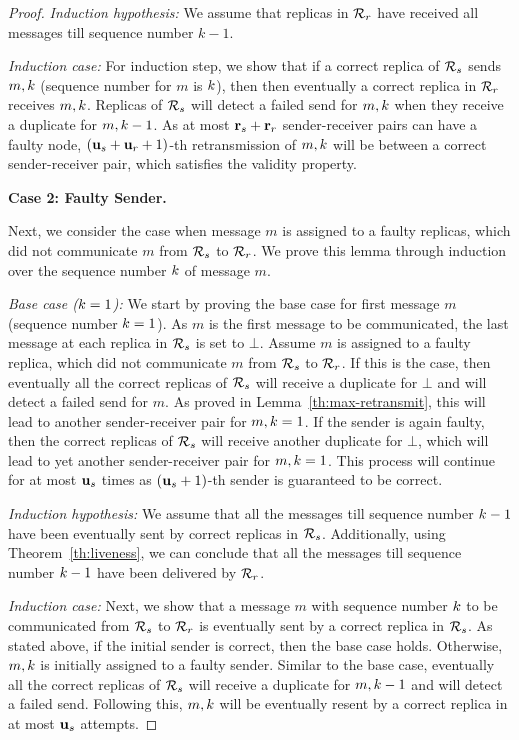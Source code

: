 \begin{proof}
    {\em Induction hypothesis:}
    We assume that replicas in $\mathcal{R}_{r}$ have received all messages till sequence number $k-1$.

    {\em Induction case:}
    For induction step, we show that if a correct replica of $\mathcal{R}_{s}$ sends $m, k$ (sequence number for $m$ is $k$), 
    then then eventually a correct replica in \RSM{} $\mathcal{R}_{r}$ receives $m, k$.
    Replicas of $\mathcal{R}_{s}$ will detect a failed send for $m, k$ when they receive a duplicate \quack{} for $m, k-1$. 
    As at most $\textbf{r}_{s}+\textbf{r}_{r}$ sender-receiver pairs can have a faulty node,
    $(\textbf{u}_{s}+\textbf{u}_{r}+1)$-th retransmission of $m, k$ will be between a correct sender-receiver pair, which 
    satisfies the validity property.

    {\bf Case 2: Faulty Sender.}
    
    Next, we consider the case when message $m$ is assigned to a faulty replicas, which did not communicate $m$ from $\mathcal{R}_{s}$ to $\mathcal{R}_{r}$.
    We prove this lemma through induction over the sequence number $k$ of message $m$.

    {\em Base case ($k = 1$):}
    We start by proving the base case for first message $m$ (sequence number $k = 1$).
    As $m$ is the first message to be communicated, the last  message at each replica in $\mathcal{R}_{s}$ is set to $\bot$.
    Assume $m$ is assigned to a faulty replica, which did not communicate $m$ from $\mathcal{R}_{s}$ to $\mathcal{R}_{r}$.
    If this is the case, then eventually all the correct replicas of $\mathcal{R}_{s}$ will receive a duplicate \quack{} for $\bot$ and 
    will detect a failed send for $m$.  
    As proved in Lemma~\ref{th:max-retransmit}, this will lead to another sender-receiver pair for $m, k=1$.
    If the sender is again faulty, then the correct replicas of $\mathcal{R}_{s}$ will receive another duplicate \quack{} for $\bot$, 
    which will lead to yet another sender-receiver pair for $m, k=1$.
    This process will continue for at most $\textbf{u}_{s}$ times as $(\textbf{u}_{s}+1)$-th sender is guaranteed to be correct.
    
    {\em Induction hypothesis:}
    We assume that all the messages till sequence number $k-1$ have been eventually sent by correct replicas in $\mathcal{R}_{s}$.
    Additionally, using Theorem~\ref{th:liveness}, we can conclude that all the messages till sequence number $k-1$ have been delivered by $\mathcal{R}_{r}$.

    {\em Induction case:}
    Next, we show that a message $m$ with sequence number $k$ to be communicated from $\mathcal{R}_{s}$ to $\mathcal{R}_{r}$ 
    is eventually sent by a correct replica in $\mathcal{R}_{s}$.
    As stated above, if the initial sender is correct, then the base case holds.
    Otherwise, $m, k$ is initially assigned to a faulty sender.
    Similar to the base case, eventually all the correct replicas of $\mathcal{R}_{s}$ will receive a duplicate \quack{} for $m, k-1$ and 
    will detect a failed send. 
    Following this, $m, k$ will be eventually resent by a correct replica in at most $\textbf{u}_{s}$ attempts.
\end{proof}

